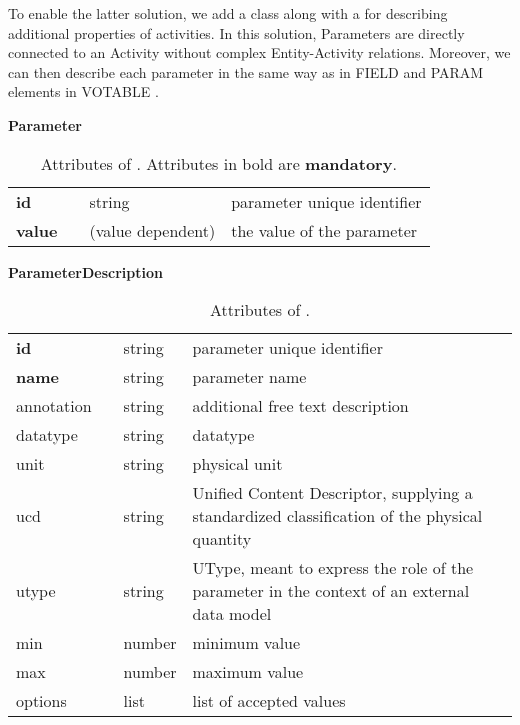 To enable the latter solution, we add a  class along with a  for describing additional properties of activities. In this solution, Parameters are directly connected to an Activity without complex Entity-Activity relations. Moreover, we can then describe each parameter in the same way as in FIELD and PARAM elements in VOTABLE \citep{std:VOTABLE}.


\begin{table}[h]
\small
{}\textwidth
\textbf{\normalsize Parameter}\vspace{0.25em}\\
\begin{tabulary}{1.0\textwidth}{@{}p{0cm}p{2.5cm}lL@{}}
\toprule
{} & \head{} &  & \\
\midrule
\textbf{id}      & & string & parameter unique identifier\\
\textbf{value}   & & (value dependent) & the value of the parameter\\
\bottomrule
\end{tabulary}
\caption{Attributes of . Attributes in bold are \textbf{mandatory}.}
\end{table}

\begin{table}[ht]
\small
{}\textwidth
\textbf{\normalsize ParameterDescription}\vspace{0.25em}\\
\begin{tabulary}{1.0\textwidth}{@{}p{0cm}p{2.5cm}lL@{}}
\toprule
{} & \head{} &  & \\
\midrule
\textbf{id}  & & string & parameter unique identifier\\
\textbf{name} & & string & parameter name\\
annotation & & string & additional free text description\\
datatype    & & string & datatype \\
unit           & & string & physical unit \\
ucd           & & string  & Unified Content Descriptor, supplying a standardized classification of the physical quantity\\
utype        & & string  & UType, meant to express the role of the parameter in the context of an external data model \\
min           & & number & minimum value \\
max           & & number & maximum value\\
options           & & list & list of accepted values\\
\bottomrule
\end{tabulary}
\caption{Attributes of .}
\end{table}

